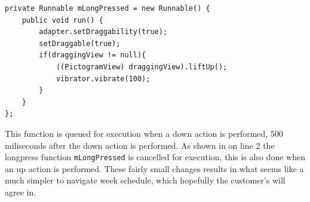 \begin{lstlisting}[float, floatplacement=h, number=left, caption={The long press function which is queued upon a \texttt{MotionEvent_Down}.}, label={lst:longpress}] 
private Runnable mLongPressed = new Runnable() {
    public void run() {
        adapter.setDraggability(true);
        setDraggable(true);
        if(draggingView != null){
            ((PictogramView) draggingView).liftUp();
            vibrator.vibrate(100);
        }
    }
};
\end{lstlisting}
This function is queued for execution when a down action is performed, 500 miliseconds after the down action is performed.
As shown in  on line 2 the longpress function \texttt{mLongPressed} is cancelled for execution, this is also done when an up action is performed. 
These fairly small changes results in what seems like a much simpler to navigate week schedule, which hopefully the customer's will agree in.

